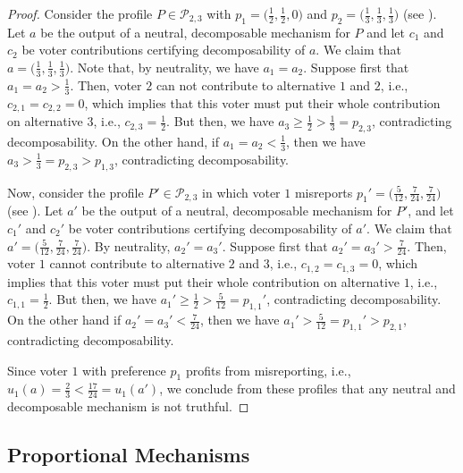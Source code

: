 \documentclass[11pt]{article}
\begin{document}
\begin{figure}
    \label{fig:decomposability_truthfulness}
\end{figure}\begin{proof}
    Consider the profile $P \in \mathcal{P}_{2,3}$ with $p_1 = \big(\frac{1}{2}, \frac{1}{2}, 0\big)$ and $p_2 = \big(\frac{1}{3}, \frac{1}{3}, \frac{1}{3}\big)$ (see ).
    Let $a$ be the output of a neutral, decomposable mechanism for $P$ and let $c_1$ and $c_2$ be voter contributions certifying decomposability of $a$. We claim that $a = \big(\frac{1}{3}, \frac{1}{3}, \frac{1}{3}\big)$. 
    Note that, by neutrality, we have $a_1 = a_2$. 
    Suppose first that $a_1 = a_2 > \frac{1}{3}$.
    Then, voter $2$ can not contribute to alternative $1$ and $2$, i.e., $c_{2,1} = c_{2,2} = 0$, which implies that this voter must put their whole contribution on alternative $3$, i.e., $c_{2,3} = \frac{1}{2}$. But then, we have $a_3 \ge \frac{1}{2} > \frac{1}{3} = p_{2,3}$, contradicting decomposability.
    On the other hand, if $a_1 = a_2 < \frac{1}{3}$, then we have $a_3 > \frac{1}{3} = p_{2,3} > p_{1,3}$, contradicting decomposability. 

    Now, consider the profile $P' \in \mathcal{P}_{2,3}$ in which voter $1$ misreports $p_1'= \big(\frac{5}{12}, \frac{7}{24}, \frac{7}{24}\big)$ (see ). 
    Let $a'$ be the output of a neutral, decomposable mechanism for $P'$, and let $c_1'$ and $c_2'$ be voter contributions certifying decomposability of $a'$. 
    We claim that $a' = \big(\frac{5}{12}, \frac{7}{24}, \frac{7}{24}\big)$. 
    By neutrality, $a_2' = a_3'$. Suppose first that $a_2' = a_3' > \frac{7}{24}$. Then, voter $1$ cannot contribute to alternative $2$ and $3$, i.e., $c_{1,2} = c_{1,3} = 0$, which implies that this voter must put their whole contribution on alternative $1$, i.e., $c_{1,1} = \frac{1}{2}$. But then, we have $a_1' \ge \frac{1}{2} > \frac{5}{12} = p_{1,1}'$, contradicting decomposability.
    On the other hand if $a_2' = a_3' < \frac{7}{24}$, then we have $a_1' > \frac{5}{12} = p_{1,1}' > p_{2,1}$, contradicting decomposability.

    Since voter $1$ with preference $p_1$ profits from misreporting, i.e., $u_1(a) = \frac{2}{3} < \frac{17}{24} = u_1(a')$, we conclude from these profiles that any neutral and decomposable mechanism is not truthful.
\end{proof}



\smallskip

\subsection{Proportional Mechanisms}\label{subsec:prop-mechanisms}
\end{document}
